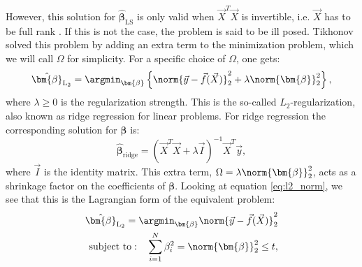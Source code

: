 However, this solution for $\hat{\bm{\beta}}_{\mathrm{LS}}$ is only valid when $\vec{X}^T \vec{X}$ is invertible, i.e. $\vec{X}$ has to be full rank \citep{hastieElementsStatisticalLearning2009}. If this is not the case, the problem is said to be ill posed. Tikhonov solved this problem by adding an extra term to the minimization problem, which we will call $\Omega$ for simplicity. For a specific choice of $\Omega$, one gets:
\begin{equation}
  \label{eq:l2_norm}
  \hat{\bm{\beta}}_{\mathrm{L_2}} = \argmin_{\bm{\beta}} \left \{\norm{ \vec{y} - \vec{f}(\vec{X}) }_2^2 + \lambda \norm{ \bm{\beta} }^2_2 \right \},
\end{equation}
where $\lambda \geq 0$ is the regularization strength. This is the so-called $L_2$-regularization, also known as ridge regression for linear problems. For ridge regression the corresponding solution for $\bm{\beta}$ is:
\begin{equation}
  \label{eq:l2_norm_linear}
  \hat{\bm{\beta}}_{\mathrm{ridge}} =  \left( \vec{X}^T \vec{X} + \lambda \vec{I} \right)^{-1} \vec{X}^T \vec{y},
\end{equation}
where $\vec{I}$ is the identity matrix. This extra term, $\Omega =  \lambda \norm{ \bm{\beta} }^2_2$, acts as a shrinkage factor on the coefficients of $\bm{\beta}$. Looking at equation \eqref{eq:l2_norm}, we see that this is the Lagrangian form of the equivalent problem: 
\begin{equation}
  \begin{split}
    \hat{\bm{\beta}}_{\mathrm{L_2}} = \argmin_{\bm{\beta}} \norm{ \vec{y} - \vec{f}(\vec{X}) }_2^2 \\
    \mathrm{subject~to:} \quad \sum_{i=1}^N \beta_i^2 = \norm{\bm{\beta}}^2_2 \leq t,
  \end{split}
  \label{eq:l2_norm_non_lagrangian}
\end{equation}

